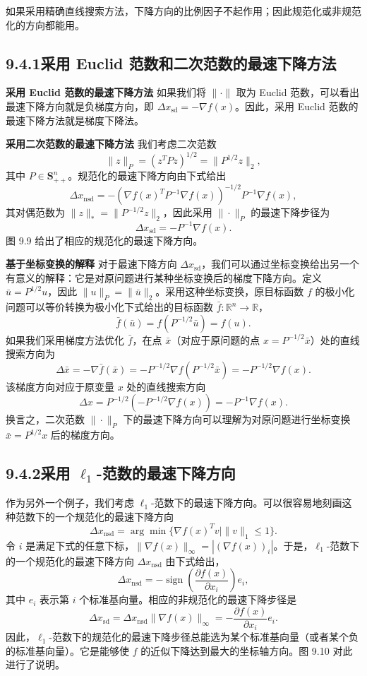 \documentclass[UTF8,12pt,a4paper,fontset=fandol]{ctexart}
\begin{document}
如果采用精确直线搜索方法，下降方向的比例因子不起作用；因此规范化或非规范化的方向都能用。

\subsection*{9.4.1\quad 采用 Euclid 范数和二次范数的最速下降方法}

\noindent\textbf{采用 Euclid 范数的最速下降方法}\quad
如果我们将 $\|\cdot\|$ 取为 Euclid 范数，可以看出最速下降方向就是负梯度方向，即 $\Delta x_{\mathrm{sd}}=-\nabla f(x)$。因此，采用 Euclid 范数的最速下降方法就是梯度下降法。

\noindent\textbf{采用二次范数的最速下降方法}\quad
我们考虑二次范数
\[
\|z\|_P=(z^TPz)^{1/2}=\|P^{1/2}z\|_2,
\]
其中 $P\in\mathbf{S}_{++}^n$。规范化的最速下降方向由下式给出
\[
\Delta x_{\mathrm{nsd}}=-(\nabla f(x)^TP^{-1}\nabla f(x))^{-1/2}P^{-1}\nabla f(x),
\]
其对偶范数为 $\|z\|_\ast=\|P^{-1/2}z\|_2$，因此采用 $\|\cdot\|_P$ 的最速下降步径为
\begin{equation}
\Delta x_{\mathrm{sd}}=-P^{-1}\nabla f(x).
\tag{9.25}
\end{equation}
图 9.9 给出了相应的规范化的最速下降方向。

\noindent\textbf{基于坐标变换的解释}\quad
对于最速下降方向 $\Delta x_{\mathrm{sd}}$，我们可以通过坐标变换给出另一个有意义的解释：它是对原问题进行某种坐标变换后的梯度下降方向。定义 $\bar{u}=P^{1/2}u$，因此 $\|u\|_P=\|\bar{u}\|_2$。采用这种坐标变换，原目标函数 $f$ 的极小化问题可以等价转换为极小化下式给出的目标函数 $\bar{f}:\mathbb{R}^n\to\mathbb{R}$，
\[
\bar{f}(\bar{u})=f(P^{-1/2}\bar{u})=f(u).
\]
如果我们采用梯度方法优化 $\bar{f}$，在点 $\bar{x}$（对应于原问题的点 $x=P^{-1/2}\bar{x}$）处的直线搜索方向为
\[
\Delta\bar{x}=-\nabla\bar{f}(\bar{x})=-P^{-1/2}\nabla f(P^{-1/2}\bar{x})=-P^{-1/2}\nabla f(x).
\]
该梯度方向对应于原变量 $x$ 处的直线搜索方向
\[
\Delta x=P^{-1/2}(-P^{-1/2}\nabla f(x))=-P^{-1}\nabla f(x).
\]
换言之，二次范数 $\|\cdot\|_P$ 下的最速下降方向可以理解为对原问题进行坐标变换 $\bar{x}=P^{1/2}x$ 后的梯度方向。

\subsection*{9.4.2\quad 采用 $\ell_1$-范数的最速下降方向}

作为另外一个例子，我们考虑 $\ell_1$-范数下的最速下降方向。可以很容易地刻画这种范数下的一个规范化的最速下降方向
\[
\Delta x_{\mathrm{nsd}}=\arg\min\{\nabla f(x)^Tv\mid \|v\|_1\leq1\}.
\]
令 $i$ 是满足下式的任意下标，$\|\nabla f(x)\|_\infty=|(\nabla f(x))_i|$。于是，$\ell_1$-范数下的一个规范化的最速下降方向 $\Delta x_{\mathrm{nsd}}$ 由下式给出，
\[
\Delta x_{\mathrm{nsd}}=-\operatorname{sign}\left(\frac{\partial f(x)}{\partial x_i}\right)e_i,
\]
其中 $e_i$ 表示第 $i$ 个标准基向量。相应的非规范化的最速下降步径是
\[
\Delta x_{\mathrm{sd}}=\Delta x_{\mathrm{nsd}}\|\nabla f(x)\|_\infty
=-\frac{\partial f(x)}{\partial x_i}e_i.
\]
因此，$\ell_1$-范数下的规范化的最速下降步径总能选为某个标准基向量（或者某个负的标准基向量）。它是能够使 $f$ 的近似下降达到最大的坐标轴方向。图 9.10 对此进行了说明。
\end{document}
